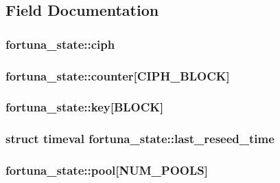 \subsection{Field Documentation}
\hypertarget{structfortuna__state_a95ce19ebcf8f4b5194747800cda1c30c}{
\subsubsection[{ciph}]{ fortuna\-\_\-state\-::ciph}}\label{structfortuna__state_a95ce19ebcf8f4b5194747800cda1c30c}
\hypertarget{structfortuna__state_a98c15b091e0c6406775caf43044234ae}{
\subsubsection[{counter}]{ fortuna\-\_\-state\-::counter\mbox{[}{\bf C\-I\-P\-H\-\_\-\-B\-L\-O\-C\-K}\mbox{]}}}\label{structfortuna__state_a98c15b091e0c6406775caf43044234ae}
\hypertarget{structfortuna__state_ab0661b7a7c12092dc667af5cdbd8d9cf}{
\subsubsection[{key}]{ fortuna\-\_\-state\-::key\mbox{[}{\bf B\-L\-O\-C\-K}\mbox{]}}}\label{structfortuna__state_ab0661b7a7c12092dc667af5cdbd8d9cf}
\hypertarget{structfortuna__state_a6d4e1a0a714f4826e1ac2568ef39362c}{
\subsubsection[{last\-\_\-reseed\-\_\-time}]{\setlength{\rightskip}{0pt plus 5cm}struct timeval fortuna\-\_\-state\-::last\-\_\-reseed\-\_\-time}}\label{structfortuna__state_a6d4e1a0a714f4826e1ac2568ef39362c}
\hypertarget{structfortuna__state_a53d7ea36f61adaa577f1328071abc3e8}{
\subsubsection[{pool}]{ fortuna\-\_\-state\-::pool\mbox{[}{\bf N\-U\-M\-\_\-\-P\-O\-O\-L\-S}\mbox{]}}}\label{structfortuna__state_a53d7ea36f61adaa577f1328071abc3e8}
